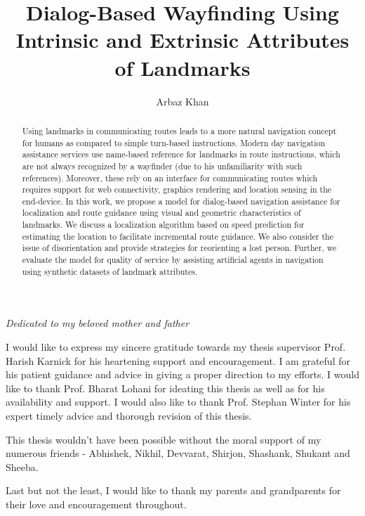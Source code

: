 \documentclass{iitkthesis}
\begin{document}
\title{Dialog-Based Wayfinding Using Intrinsic and Extrinsic Attributes of Landmarks}

\author{Arbaz Khan}
\dissertation
\maketitle
\makecertificate
\begin{abstract}
Using landmarks in communicating routes leads to a more natural 
navigation concept for humans as compared to simple turn-based 
instructions. Modern day navigation assistance services use name-based 
reference for landmarks in route instructions, which are not always 
recognized by a wayfinder (due to his unfamiliarity with such references).
Moreover, these rely on an interface for communicating routes which 
requires support for web connectivity, graphics rendering and location 
sensing in the end-device. In this work, we propose a model for dialog-based 
navigation assistance for localization and route guidance using visual 
and geometric characteristics of landmarks. We discuss a localization 
algorithm based on speed prediction for estimating the location to 
facilitate incremental route guidance. We also consider the issue of 
disorientation and provide strategies for reorienting a lost person. 
Further, we evaluate the model for quality of service by assisting 
artificial agents in navigation using synthetic datasets of landmark 
attributes.
\end{abstract}
\begin{dedication}
\emph{Dedicated to my beloved mother and father}
\end{dedication}
\begin{acknowledgments}
I would like to express my sincere gratitude towards my thesis supervisor Prof.
Harish Karnick for his heartening support and encouragement. I am grateful for his 
patient guidance and advice in giving a proper direction to my efforts. I would like to thank Prof. Bharat Lohani for ideating this thesis as well as for his availability and support. I would also like to thank Prof. Stephan Winter for his expert timely advice and thorough revision of this thesis.

This thesis wouldn't have been possible without the moral support of my numerous friends - Abhishek, Nikhil, Devvarat, Shirjon, Shashank, Shukant and Sheeba.

Last but not the least, I would like to thank my parents and grandparents for
their love and encouragement throughout.
\end{acknowledgments}
\tableofcontents
\listoftables\listoffigures
\renewcommand{\thepage}{\arabic{page}}
\end{document}
